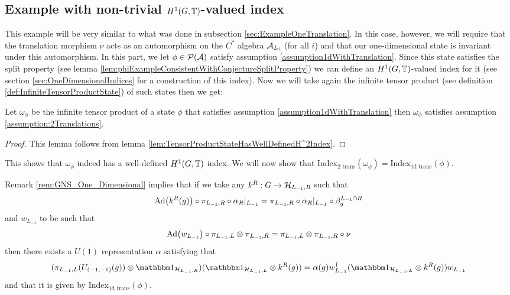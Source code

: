 \documentclass[11pt,a4paper,twoside]{article}
\numberwithin{equation}{section}
\begin{document}
	\subsection{Example with non-trivial \texorpdfstring{$H^1(G,\TT)$}{}-valued index}\label{sec:ExampleTwoTranslations}
	This example will be very similar to what was done in subsection \ref{sec:ExampleOneTranslation}. In this case, however, we will require that the translation morphism $\nu$ acts as an automorphism on the $C^*$ algebra $\AA_{L_i}$ (for all $i$) and that our one-dimensional state is invariant under this automorphism. In this part, we let $\phi\in\PP(\AA)$ satisfy assumption \ref{assumption1dWithTranslation}. Since this state satisfies the split property (see lemma \ref{lem:phiExampleConsistentWithConjectureSplitProperty}) we can define an $H^1(G,\TT)$-valued index for it (see section \ref{sec:OneDimensionalIndices} for a construction of this index). Now we will take again the infinite tensor product (see definition \ref{def:InfiniteTensorProductState}) of such states then we get:
	\begin{lemma}
		Let $\omega_\phi$ be the infinite tensor product of a state $\phi$ that satisfies assumption \ref{assumption1dWithTranslation} then $\omega_\phi$ satisfies assumption \ref{assumption:2Translations}.
	\end{lemma}
	\begin{proof}
		This lemma follows from lemma \ref{lem:TensorProductStateHasWellDefinedH^2Index}.
	\end{proof}
	This shows that $\omega_\phi$ indeed has a well-defined $H^1(G,\TT)$ index. We will now show that $\textrm{Index}_{\text{2 trans}}(\omega_\phi)=\textrm{Index}_{\text{1d trans}}(\phi)$.
	\begin{remark}\label{rem:GNS_One_DimensionalTwoTranslations}
		Remark \ref{rem:GNS_One_Dimensional} implies that if we take any $k^R:G\rightarrow \HH_{L_{-1},R}$ such that
		\begin{equation}
			\Ad{k^R(g)}\circ\pi_{L_{-1},R}\circ\alpha_R|_{L_{-1}}=\pi_{L_{-1},R}\circ\alpha_R|_{L_{-1}}\circ\beta_{g}^{L_{-1}\cap R}
		\end{equation}
		and $w_{L_{-1}}$ to be such that
		\begin{equation}
			\Ad{w_{L_{-1}}}\circ\pi_{L_{-1},L}\otimes \pi_{L_{-1},R}=\pi_{L_{-1},L}\otimes \pi_{L_{-1},R}\circ\nu
		\end{equation}
		then there exists a $U(1)$ representation $\alpha$ satisfying that
		\begin{equation}
			(\pi_{L_{-1},L}(U_{(-1,-1)}(g))\otimes \id_{\HH_{L_{-1},R}}) (\id_{\HH_{L_{-1},L}}\otimes k^R(g))=\alpha(g) w_{L_{-1}}^\dagger(\id_{\HH_{L_{-1},L}}\otimes k^R(g))w_{L_{-1}}
		\end{equation}
		and that it is given by $\textrm{Index}_{\text{1d trans}}(\phi)$.
	\end{remark}
\end{document}
